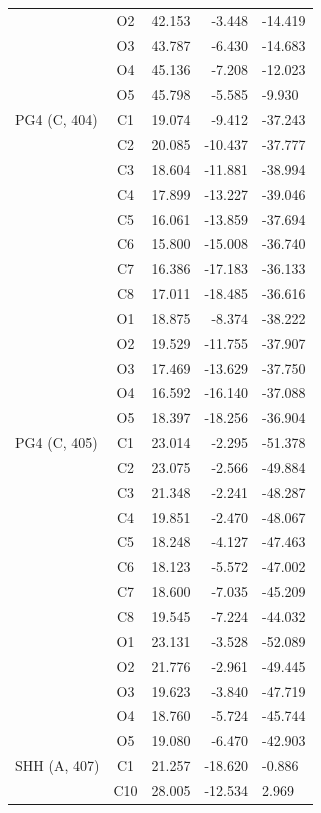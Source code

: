 \begin{longtable}{@{}lcrr@{}}
   & O2 & 42.153 & -3.448 & -14.419 \\
   & O3 & 43.787 & -6.430 & -14.683 \\
   & O4 & 45.136 & -7.208 & -12.023 \\
   & O5 & 45.798 & -5.585 & -9.930 \\
  \cmidrule(r){1-5}
  PG4 (C, 404) & C1 & 19.074 & -9.412 & -37.243 \\
   & C2 & 20.085 & -10.437 & -37.777 \\
   & C3 & 18.604 & -11.881 & -38.994 \\
   & C4 & 17.899 & -13.227 & -39.046 \\
   & C5 & 16.061 & -13.859 & -37.694 \\
   & C6 & 15.800 & -15.008 & -36.740 \\
   & C7 & 16.386 & -17.183 & -36.133 \\
   & C8 & 17.011 & -18.485 & -36.616 \\
   & O1 & 18.875 & -8.374 & -38.222 \\
   & O2 & 19.529 & -11.755 & -37.907 \\
   & O3 & 17.469 & -13.629 & -37.750 \\
   & O4 & 16.592 & -16.140 & -37.088 \\
   & O5 & 18.397 & -18.256 & -36.904 \\
  \cmidrule(r){1-5}
  PG4 (C, 405) & C1 & 23.014 & -2.295 & -51.378 \\
   & C2 & 23.075 & -2.566 & -49.884 \\
   & C3 & 21.348 & -2.241 & -48.287 \\
   & C4 & 19.851 & -2.470 & -48.067 \\
   & C5 & 18.248 & -4.127 & -47.463 \\
   & C6 & 18.123 & -5.572 & -47.002 \\
   & C7 & 18.600 & -7.035 & -45.209 \\
   & C8 & 19.545 & -7.224 & -44.032 \\
   & O1 & 23.131 & -3.528 & -52.089 \\
   & O2 & 21.776 & -2.961 & -49.445 \\
   & O3 & 19.623 & -3.840 & -47.719 \\
   & O4 & 18.760 & -5.724 & -45.744 \\
   & O5 & 19.080 & -6.470 & -42.903 \\
  \cmidrule(r){1-5}
  SHH (A, 407) & C1 & 21.257 & -18.620 & -0.886 \\
   & C10 & 28.005 & -12.534 & 2.969 \\

\end{longtable}
